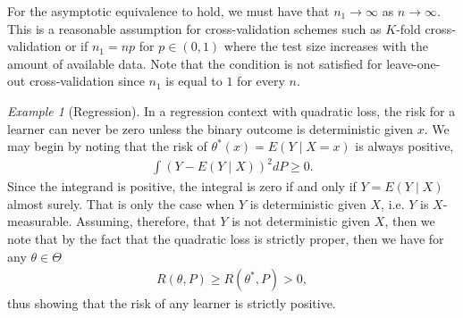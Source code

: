 \documentclass[11pt, a4paper]{article}
\theoremstyle{definition}
\theoremstyle{remark}
\newtheorem{example}{Example}
\newcommand{\q}{q}
\newcommand{\btheta}{\theta}
\begin{document}
For the asymptotic equivalence to hold, we must have that $ n_1 \to \infty $ as $ n \to \infty $. This is a reasonable assumption for cross-validation schemes such as $ K $-fold cross-validation or if $ n_1 = np $ for $ p \in (0,1) $ where the test size increases with the amount of available data. Note that the condition is not satisfied for leave-one-out cross-validation since $ n_1$ is equal to $ 1 $ for every $ n $.  
\begin{example}[Regression]
   In a regression context with quadratic loss, the risk for a learner can never be zero unless the binary outcome is deterministic given $ x $. We may begin by noting that the risk of $ \theta^*(x) = E(Y \mid X = x) $ is always positive,
   \begin{align*}
       \int (Y - E(Y \mid X))^2 d P \geq 0. 
   \end{align*}
   Since the integrand is positive, the integral is zero if and only if $ Y = E(Y \mid X) $ almost surely. That is only the case when $ Y $ is deterministic given $ X $, i.e. $ Y $ is $ X $-measurable. Assuming, therefore, that $ Y $ is not deterministic given $ X $, then we note that by the fact that the quadratic loss is strictly proper, then we have for any $ \theta \in \Theta $
   \begin{align*}
       R(\theta, P) \geq R(\theta^*, P) > 0,
   \end{align*}
    thus showing that the risk of any learner is strictly positive.
\end{example}


\end{document}
